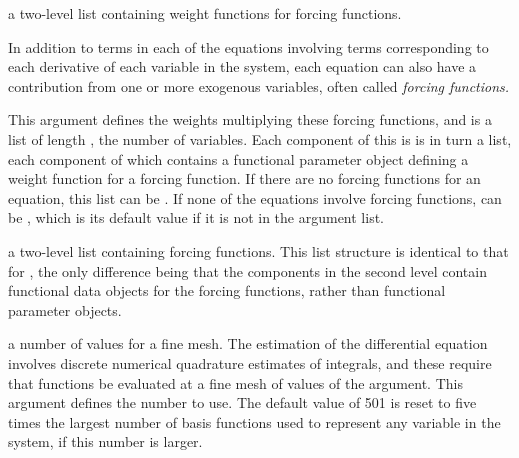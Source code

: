 \begin{Arguments}
\begin{ldescription}
\item[\code{awtlist}] a two-level list containing weight functions for forcing functions.

In addition to terms in each of the equations involving terms corresponding
to each derivative of each variable in the system, each equation can
also have a contribution from one or more exogenous variables, often
called \emph{forcing functions.}

This argument defines the weights multiplying these
forcing functions, and is a list of length , the number of variables.
Each component of this is is in turn a list, each component of which contains
a functional parameter object defining a weight function for a forcing function.
If there are no forcing functions for an equation, this list can be .
If none of the equations involve forcing functions,  can be
, which is its default value if it is not in the argument list.

\item[\code{ufdlist}] a two-level list containing forcing functions.  This list structure is 
identical to that for , the only difference being that the
components in the second level contain functional data objects for the 
forcing functions, rather than functional parameter objects.

\item[\code{nfine}] a number of values for a fine mesh.
The estimation of the differential equation involves discrete
numerical quadrature estimates of integrals, and these require
that functions be evaluated at a fine mesh of values of the
argument.  This argument defines the number to use.  The default value of 501
is reset to five times the largest number of basis functions used to represent 
any variable in the system, if this number is larger.

\end{ldescription}
\end{Arguments}
